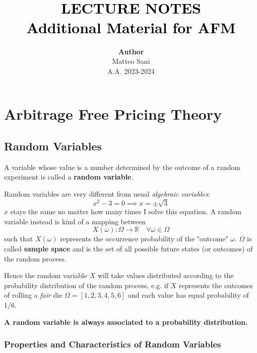 \documentclass[12pt,a4paper]{book}
\newcommand{\HRule}[1]{\color{blue}{\rule{\linewidth}{#1}}}
\begin{document}
\title{\normalsize \textsc{}
		\\ [2.0cm]
		\HRule{1.5pt} \\
		\LARGE \textbf{\textcolor{black}{\uppercase{lecture notes}}
		\HRule{2.0pt} \\ [0.6cm] \textcolor{black}{\Large{Additional Material for AFM}} \vspace*{10\baselineskip}}
		}
\date{}
\author{\textbf{Author} \\ 
		Matteo Sani \\
		A.A. 2023-2024}

\maketitle

\chapter{Arbitrage Free Pricing Theory}
\section{Random Variables}
A variable whose value is a number determined by the outcome of a random experiment is called a \textbf{random variable}.

Random variables are very different from usual \emph{algebraic variables}:
\begin{equation*}
x^2 - 3 = 0 \implies x = \pm \sqrt{3}
\end{equation*}	
$x$ stays the same no matter how many times I solve this equation.
A random variable instead is kind of a mapping between 
\begin{equation*}
X(\omega):\Omega\rightarrow \mathbb{R}\quad \forall\omega\in\Omega
\end{equation*}
such that $X(\omega)$ represents the occurrence probability of the "outcome" $\omega$. $\Omega$ is called \textbf{sample space} and is the set of all possible future states (or outcomes) of the random process.
	
Hence the random variable $X$ will take values distributed according to the probability distribution of the random process, e.g. if $X$ represents the outcomes of rolling a \emph{fair} die $\Omega = [1,2,3,4,5,6]$ and each value has equal probability of 1/6.

\textbf{A random variable is always associated to a probability distribution.}

\subsection{Properties and Characteristics of Random Variables}		
\end{document}
